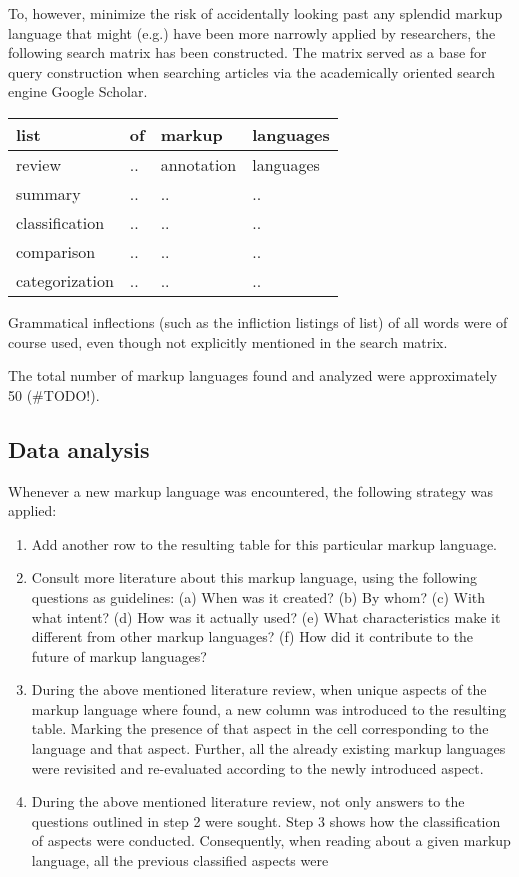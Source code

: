 \documentclass{scrreprt}
\begin{document}
To, however, minimize the risk of accidentally looking past any splendid markup language that might (e.g.) have been more narrowly applied by researchers, the following search matrix has been constructed. The matrix served as a base for query construction when searching articles via the academically oriented search engine Google Scholar.

\vspace{6pt}
\begin{tabular}{ |l|l|l|l| }
  \hline
  list            & of & markup     & languages \\\hline
  review          & ..   & annotation & languages \\\hline
  summary         & ..   & .. & .. \\\hline
  classification  & ..   & .. & .. \\\hline
  comparison      & ..   & .. & .. \\\hline
  categorization  & ..   & .. & .. \\\hline
\end{tabular}
\vspace{6pt}

Grammatical inflections (such as the infliction listings of list) of all words were of course used, even though not explicitly mentioned in the search matrix.

The total number of markup languages found and analyzed were approximately 50 (\#TODO!).


\subsection{Data analysis}
Whenever a new markup language was encountered, the following strategy was applied:

\begin{enumerate}
\item Add another row to the resulting table for this particular markup language.
\item Consult more literature about this markup language, using the following questions as guidelines: (a) When was it created? (b) By whom? (c) With what intent? (d) How was it actually used? (e) What characteristics make it different from other markup languages? (f) How did it contribute to the future of markup languages?
\item During the above mentioned literature review, when unique aspects of the markup language where found, a new column was introduced to the resulting table. Marking the presence of that aspect in the cell corresponding to the language and that aspect. Further, all the already existing markup languages were revisited and re-evaluated according to the newly introduced aspect.
\item During the above mentioned literature review, not only answers to the questions outlined in step 2 were sought. Step 3 shows how the classification of aspects were conducted. Consequently, when reading about a given markup language, all the previous classified aspects were 
\end{enumerate}
\end{document}
